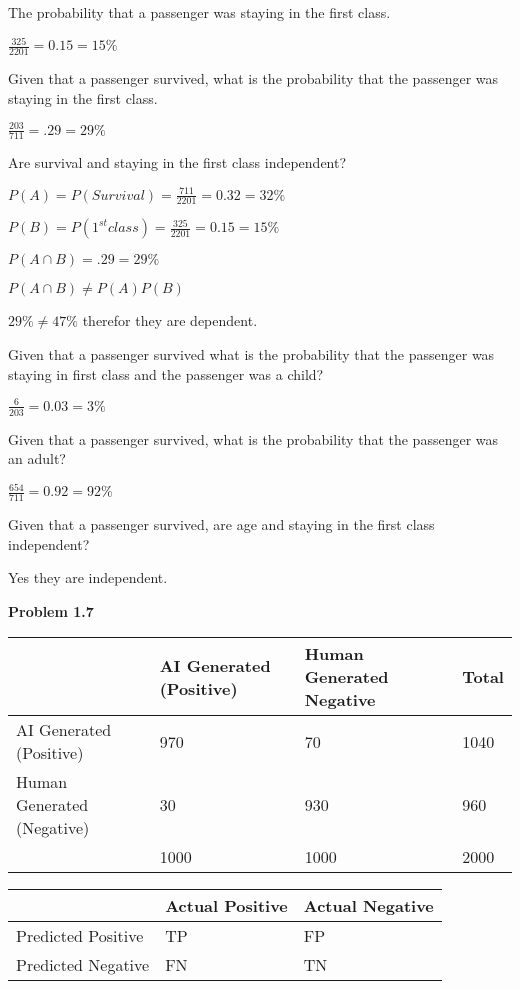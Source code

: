 \documentclass[12pt, letterpaper]{article}
\begin{document}
The probability that a passenger was staying in the first class.

$\frac{325}{2201} = 0.15 = 15\%$

Given that a passenger survived, what is the probability that the passenger was staying in the first class.

$\frac{203}{711} = .29 = 29\%$

Are survival and staying in the first class independent?

$P(A) = P(Survival) = \frac{711}{2201} = 0.32 = 32\%$

$P(B) = P(1^{st} class) = \frac{325}{2201} = 0.15 = 15\%$

$P(A \cap B) = .29 = 29\%$

$P(A \cap B) \neq P(A) P(B)$

$29\% \neq 47\%$ therefor they are dependent.

Given that a passenger survived what is the probability that the passenger was staying in first class and the passenger was a child?

$\frac{6}{203} = 0.03 = 3\%$

Given that a passenger survived, what is the probability that the passenger was an adult?

$\frac{654}{711} = 0.92 = 92\%$

Given that a passenger survived, are age and staying in the first class independent?

Yes they are independent.

\textbf{Problem 1.7}

\begin{center}
\begin{tabular}{ | m{10em} | m{3cm}| m{3cm} | m{2cm} | } 
    \hline
    & AI Generated (Positive) & Human Generated Negative & Total \\
    \hline
    AI Generated (Positive) & 970 & 70 & 1040 \\
    \hline
    Human Generated (Negative) & 30 & 930 & 960 \\
    \hline
    & 1000 & 1000 & 2000 \\
    \hline
\end{tabular}
\end{center}

\begin{center}
\begin{tabular}{ | m{10em} | m{3cm} | m{3cm} | } 
    \hline
    & Actual Positive & Actual Negative \\
    \hline
    Predicted Positive & TP & FP \\
    \hline
    Predicted Negative & FN & TN \\
    \hline
\end{tabular}
\end{center}
\end{document}
